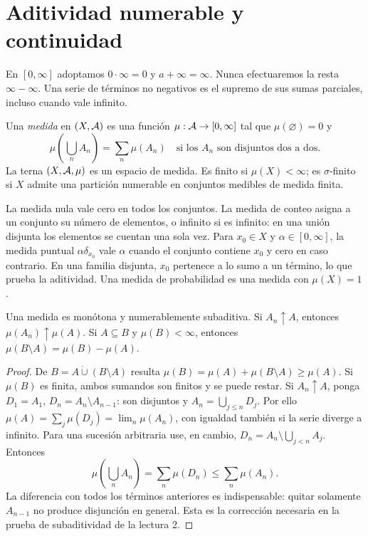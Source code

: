 \section{Aditividad numerable y continuidad}\label{lectura:v2-02}
En $[0,\infty]$ adoptamos $0\cdot\infty=0$ y $a+\infty=\infty$. Nunca efectuaremos la resta $\infty-\infty$. Una serie de términos no negativos es el supremo de sus sumas parciales, incluso cuando vale infinito.
\begin{definicion}
Una \emph{medida} en $(X,\mathcal A)$ es una función $\mu:\mathcal A\to[0,\infty]$ tal que $\mu(\varnothing)=0$ y
\[\mu\left(\bigcup_nA_n\right)=\sum_n\mu(A_n)\quad\text{si los }A_n\text{ son disjuntos dos a dos}.\]
La terna $(X,\mathcal A,\mu)$ es un espacio de medida. Es finito si $\mu(X)<\infty$; es $\sigma$-finito si $X$ admite una partición numerable en conjuntos medibles de medida finita.
\end{definicion}
\begin{ejemplo}
La medida nula vale cero en todos los conjuntos. La medida de conteo asigna a un conjunto su número de elementos, o infinito si es infinito: en una unión disjunta los elementos se cuentan una sola vez. Para $x_0\in X$ y $\alpha\in[0,\infty]$, la medida puntual $\alpha\delta_{x_0}$ vale $\alpha$ cuando el conjunto contiene $x_0$ y cero en caso contrario. En una familia disjunta, $x_0$ pertenece a lo sumo a un término, lo que prueba la aditividad. Una medida de probabilidad es una medida con $\mu(X)=1$.
\end{ejemplo}
\begin{teorema}\label{teo:v2-contmedida}
Una medida es monótona y numerablemente subaditiva. Si $A_n\uparrow A$, entonces $\mu(A_n)\uparrow\mu(A)$. Si $A\subseteq B$ y $\mu(B)<\infty$, entonces $\mu(B\setminus A)=\mu(B)-\mu(A)$.
\end{teorema}
\begin{proof}
De $B=A\mathbin{\dot\cup}(B\setminus A)$ resulta $\mu(B)=\mu(A)+\mu(B\setminus A)\ge\mu(A)$. Si $\mu(B)$ es finita, ambos sumandos son finitos y se puede restar. Si $A_n\uparrow A$, ponga $D_1=A_1$, $D_n=A_n\setminus A_{n-1}$: son disjuntos y $A_n=\bigcup_{j\le n}D_j$. Por ello $\mu(A)=\sum_j\mu(D_j)=\lim_n\mu(A_n)$, con igualdad también si la serie diverge a infinito. Para una sucesión arbitraria use, en cambio, $D_n=A_n\setminus\bigcup_{j<n}A_j$. Entonces
\[\mu\left(\bigcup_nA_n\right)=\sum_n\mu(D_n)\le\sum_n\mu(A_n).\]
La diferencia con todos los términos anteriores es indispensable: quitar solamente $A_{n-1}$ no produce disjunción en general. Esta es la corrección necesaria en la prueba de subaditividad de la lectura 2.
\end{proof}

